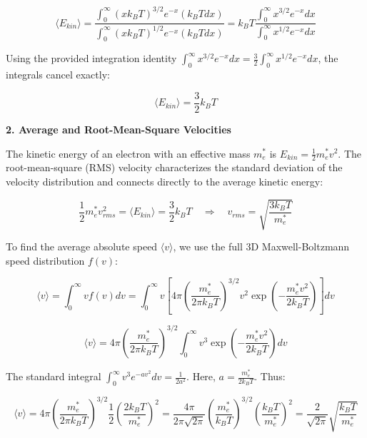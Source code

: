 \begin{equation*}
  \langle E_{kin} \rangle = \frac{\int_{0}^{\infty} (x k_B T)^{3/2} e^{-x} (k_B T dx)}{\int_{0}^{\infty} (x k_B T)^{1/2} e^{-x} (k_B T dx)} = k_B T \frac{\int_{0}^{\infty} x^{3/2} e^{-x} dx}{\int_{0}^{\infty} x^{1/2} e^{-x} dx}
\end{equation*}

Using the provided integration identity $\int_0^\infty x^{3/2} e^{-x} dx = \frac{3}{2} \int_0^\infty x^{1/2} e^{-x} dx$, the integrals cancel exactly:

\begin{equation*}
  \boxed{\langle E_{kin} \rangle = \frac{3}{2} k_B T}
\end{equation*}

\textbf{2. Average and Root-Mean-Square Velocities}

The kinetic energy of an electron with an effective mass $m_e^*$ is $E_{kin} = \frac{1}{2} m_e^* v^2$. The root-mean-square (RMS) velocity characterizes the standard deviation of the velocity distribution and connects directly to the average kinetic energy:

\begin{equation*}
  \frac{1}{2} m_e^* v_{rms}^2 = \langle E_{kin} \rangle = \frac{3}{2} k_B T \quad\Longrightarrow\quad \boxed{v_{rms} = \sqrt{\frac{3 k_B T}{m_e^*}}}
\end{equation*}

To find the average absolute speed $\langle v \rangle$, we use the full 3D Maxwell-Boltzmann speed distribution $f(v)$:

\begin{equation*}
  \langle v \rangle = \int_0^\infty v f(v) dv = \int_0^\infty v \left[ 4\pi \left(\frac{m_e^*}{2\pi k_B T}\right)^{3/2} v^2 \exp\left(-\frac{m_e^* v^2}{2 k_B T}\right) \right] dv
\end{equation*}

\begin{equation*}
  \langle v \rangle = 4\pi \left(\frac{m_e^*}{2\pi k_B T}\right)^{3/2} \int_0^\infty v^3 \exp\left(-\frac{m_e^* v^2}{2 k_B T}\right) dv
\end{equation*}

The standard integral $\int_0^\infty v^3 e^{-a v^2} dv = \frac{1}{2a^2}$. Here, $a = \frac{m_e^*}{2 k_B T}$. Thus:

\begin{equation*}
  \langle v \rangle = 4\pi \left(\frac{m_e^*}{2\pi k_B T}\right)^{3/2} \frac{1}{2} \left(\frac{2 k_B T}{m_e^*}\right)^2 = \frac{4\pi}{2\pi\sqrt{2\pi}} \left(\frac{m_e^*}{k_B T}\right)^{3/2} \left(\frac{k_B T}{m_e^*}\right)^2 = \frac{2}{\sqrt{2\pi}} \sqrt{\frac{k_B T}{m_e^*}}
\end{equation*}

